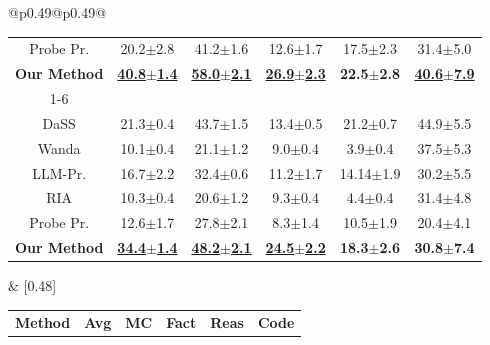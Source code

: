 \begin{table}[!t]
\begin{tabular}{@{}p{}@{}p{}@{}}
{\begin{tabular}{c c c c c c}
Probe Pr. &20.2{\scriptsize$\pm$2.8} & 41.2{\scriptsize$\pm$1.6} & 12.6{\scriptsize$\pm$1.7} & 17.5{\scriptsize$\pm$2.3} & 31.4{\scriptsize$\pm$5.0} \\
\rowcolor{icmlblue} \textbf{Our Method} & \textbf{\underline{40.8{\scriptsize$\pm$1.4}}} & \textbf{\underline{58.0{\scriptsize$\pm$2.1}}} & \textbf{\underline{26.9{\scriptsize$\pm$2.3}}} & \textbf{22.5{\scriptsize$\pm$2.8}} & \textbf{\underline{40.6{\scriptsize$\pm$7.9}}} \\
\cmidrule(lr){1-6}
\rowcolor{lightgray} \multicolumn{6}{c}{\rule{0pt}{2.2ex}\textbf{Heavy Pruning}\rule[-0.8ex]{0pt}{0pt}} \\
DaSS & 21.3{\scriptsize$\pm$0.4} & 43.7{\scriptsize$\pm$1.5} & 13.4{\scriptsize$\pm$0.5} & 21.2{\scriptsize$\pm$0.7} & 44.9{\scriptsize$\pm$5.5} \\
Wanda & 10.1{\scriptsize$\pm$0.4} & 21.1{\scriptsize$\pm$1.2} & 9.0{\scriptsize$\pm$0.4} & 3.9{\scriptsize$\pm$0.4} & 37.5{\scriptsize$\pm$5.3} \\
LLM-Pr. & 16.7{\scriptsize$\pm$2.2} & 32.4{\scriptsize$\pm$0.6} & 11.2{\scriptsize$\pm$1.7} & 14.14{\scriptsize$\pm$1.9} & 30.2{\scriptsize$\pm$5.5} \\
RIA & 10.3{\scriptsize$\pm$0.4} & 20.6{\scriptsize$\pm$1.2} & 9.3{\scriptsize$\pm$0.4} & 4.4{\scriptsize$\pm$0.4} & 31.4{\scriptsize$\pm$4.8} \\
Probe Pr. & 12.6{\scriptsize$\pm$1.7} & 27.8{\scriptsize$\pm$2.1} & 8.3{\scriptsize$\pm$1.4} & 10.5{\scriptsize$\pm$1.9} & 20.4{\scriptsize$\pm$4.1} \\
\rowcolor{icmlblue} \textbf{Our Method} & \textbf{\underline{34.4{\scriptsize$\pm$1.4}}} & \textbf{\underline{48.2{\scriptsize$\pm$2.1}}} & \textbf{\underline{24.5{\scriptsize$\pm$2.2}}} & \textbf{18.3{\scriptsize$\pm$2.6}} & \textbf{30.8{\scriptsize$\pm$7.4}} \\
\bottomrule
\end{tabular}
} &
[0.48\textwidth]{
\begin{tabular}{c c c c c c}
\toprule
\textbf{Method} & \textbf{Avg} & \textbf{MC} & \textbf{Fact} & \textbf{Reas} & \textbf{Code} \\

\end{tabular}}
\end{tabular}
\end{table}
